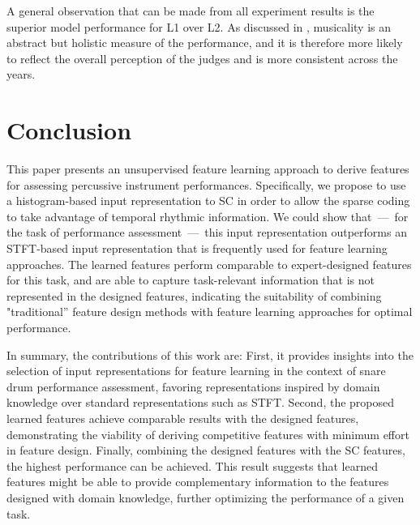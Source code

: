 \documentclass[conference]{IEEEtran}
\begin{document}
A general observation that can be made from all experiment results is the superior model performance for L1 over L2. As discussed in \cite{Wu2016}, musicality is an abstract but holistic measure of the performance, and it is therefore more likely to reflect the overall perception of the judges and is more consistent across the years. %

\section{Conclusion}\label{sec:conclusion}
This paper presents an unsupervised feature learning approach to derive features for assessing percussive instrument performances. Specifically, we propose to use a histogram-based input representation to SC in order to allow the sparse coding to take advantage of temporal rhythmic information. We could show that~---~for the task of performance assessment~---~this input representation outperforms an STFT-based input representation that is frequently used for feature learning approaches. The learned features perform comparable to expert-designed features for this task, and are able to capture task-relevant information that is not represented in the designed features, indicating the suitability of combining "traditional'' feature design methods with feature learning approaches for optimal performance.

In summary, the contributions of this work are: 
First, it provides insights into the selection of input representations for feature learning in the context of snare drum performance assessment, favoring representations inspired by domain knowledge over standard representations such as STFT. 
Second, the proposed learned features achieve comparable results with the designed features, demonstrating the viability of deriving competitive features with minimum effort in feature design. 
Finally, combining the designed features with the SC features, the highest performance can be achieved. This result suggests that learned features might be able to provide complementary information to the features designed with domain knowledge, further optimizing the performance of a given task. 
\end{document}
